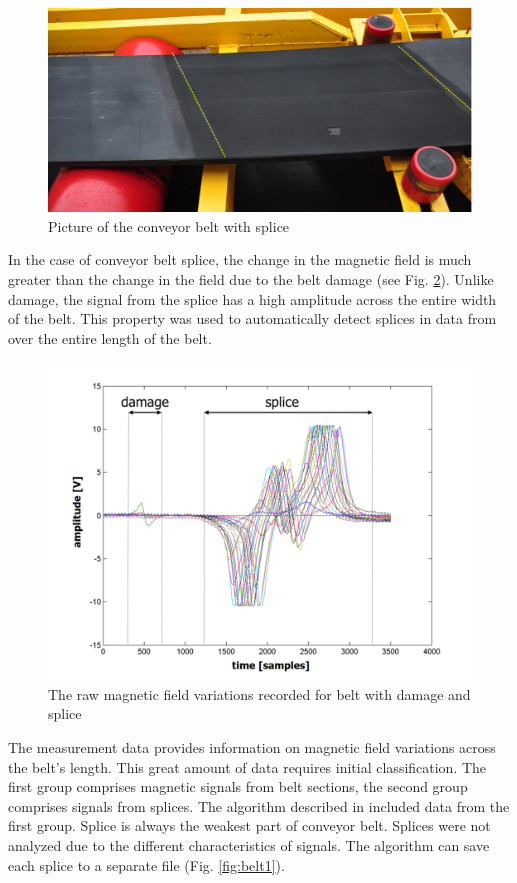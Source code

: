 \documentclass[applsci,article,preprint,moreauthors,pdftex]{Definitions/mdpi}
\begin{document}
\begin{figure}[ht!]
\centering
\includegraphics[width=\textwidth]{figs/splicetest.png}
\caption{Picture of the conveyor belt with splice}
\label{fig:belt_splice}
\end{figure}

In the case of conveyor belt splice, the change in the magnetic field is much greater than the change in the field due to the belt damage (see Fig. \ref{fig:belt_signal}). Unlike damage, the signal from the splice has a high amplitude across the entire width of the belt. This property was used to automatically detect splices in data from over the entire length of the belt.

\begin{figure}[ht!]
\centering
\includegraphics[width=.8\textwidth]{figs/splicedmg.png}
\caption{The raw magnetic field variations recorded for belt  with damage and splice}
\label{fig:belt_signal}
\end{figure}

The measurement data provides information on magnetic field variations across the belt’s length. This great amount of data requires initial classification. The first group comprises magnetic signals from belt sections, the second group comprises signals from splices. The algorithm described in \cite{blazej2013novel} included data from the first group. Splice is always the weakest part of conveyor belt. Splices were not analyzed due to the different characteristics of signals. The algorithm can save each splice to a separate file (Fig. \ref{fig:belt1}).
\end{document}
